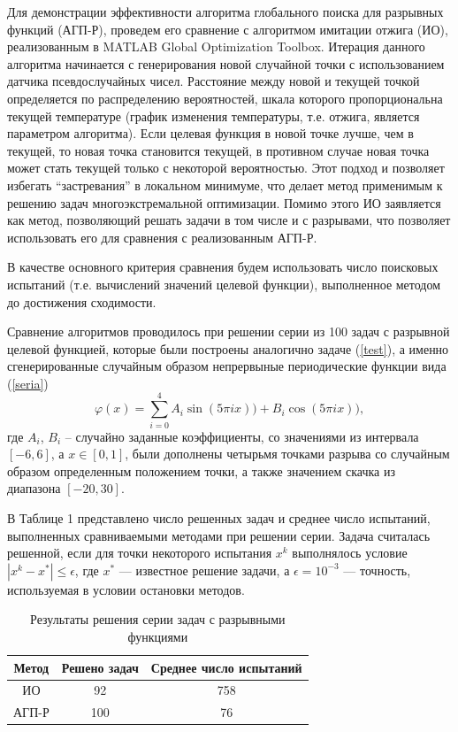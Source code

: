 \documentclass[11pt, oneside, a4paper]{article}
\begin{document}
Для демонстрации эффективности алгоритма глобального поиска для разрывных функций (АГП-Р), проведем его сравнение с алгоритмом имитации отжига (ИО), реализованным в MATLAB Global Optimization Toolbox. Итерация данного алгоритма начинается с генерирования новой случайной точки с использованием датчика псевдослучайных чисел. Расстояние между новой и текущей точкой определяется по распределению вероятностей, шкала которого пропорциональна текущей температуре (график изменения температуры, т.е. отжига, является параметром алгоритма). Если целевая функция в новой точке лучше, чем в текущей, то новая точка становится текущей, в противном случае новая точка может стать текущей только с некоторой вероятностью. Этот подход и позволяет избегать ``застревания'' в локальном минимуме, что делает метод применимым к решению задач многоэкстремальной оптимизации. Помимо этого ИО заявляется как метод, позволяющий решать задачи в том числе и с разрывами, что позволяет использовать его для сравнения с реализованным АГП-Р.

В качестве основного критерия сравнения будем использовать число поисковых испытаний (т.е. вычислений значений целевой функции), выполненное методом до достижения сходимости. 

Сравнение алгоритмов проводилось при решении серии из 100 задач с разрывной целевой функцией, которые были построены аналогично задаче (\ref{test}), а именно сгенерированные случайным образом непрервыные периодические функции вида (\ref{seria}) 
\begin{equation}\label{seria}
\varphi(x) = \sum_{i=0}^4{A_i\sin(5\pi i x)) + B_i\cos(5\pi i x))},
\end{equation}
где $A_i$, $B_i$ – случайно заданные коэффициенты, со значениями из интервала $[-6,6]$, а $x\in[0,1]$, были дополнены четырьмя точками разрыва со случайным образом определенным положением точки, а также значением скачка из диапазона $[-20,30]$.  

В Таблице 1 представлено число решенных задач и среднее число испытаний, выполненных сравниваемыми методами при решении серии. Задача считалась решенной, если для точки некоторого испытания $x^k$ выполнялось условие $\left|x^k-x^*\right|\leq \epsilon$, где $x^*$ --- известное решение задачи, а $\epsilon=10^{-3}$ --- точность, используемая в условии остановки методов.

\begin{table}[h]
	\caption{Результаты решения серии задач с разрывными функциями}
	\begin{center}
		\begin{tabular}{|c|c|c|}
			\hline
			Метод & Решено задач & Среднее число испытаний \\
			\hline
			\hline
			ИО    &  92 &   758  \\
			\hline
			АГП-Р & 100  & 76 \\
			\hline
		\end{tabular}
	\end{center}
\end{table}
\end{document}
